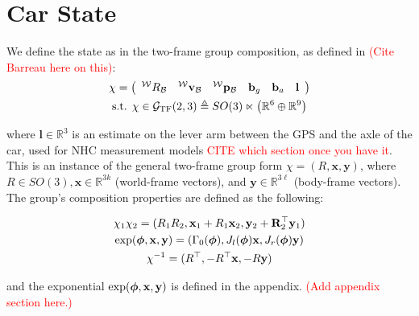 \section{Car State}

We define the state as in the two-frame group composition, as defined in \textcolor{red}{(Cite Barreau here on this)}:
\begin{equation}
  \begin{gathered}
  \chi = \left(
    \begin{array}{cccccc}
      {}^\mathcal{W}R_\mathcal{B} &
      {}^\mathcal{W}\mathbf{v}_{\mathcal{B}} &
      {}^\mathcal{W}\mathbf{p}_{\mathcal{B}} &
      \mathbf{b}_g &
      \mathbf{b}_a &
      \mathbf{l}
    \end{array}
  \right) \\
  \text{s.t. } \chi \in \mathcal{G}_{\mathrm{TF}}(2,3) \triangleq SO(3) \ltimes \left(\mathbb{R}^{6} \oplus \mathbb{R}^{9}\right)
  \end{gathered}
  \label{eq:car_state}
\end{equation}

where $\mathbf{l}\in \mathbb{R}^3$ is an estimate on the lever arm between the GPS and the axle of the car, used for NHC measurement models \textcolor{red}{CITE which section once you have it}. This is an instance of the general two-frame group form $\chi = (R,\mathbf{x},\mathbf{y})$, where $R\in SO(3), \mathbf{x} \in \mathbb{R}^{3k}$ (world-frame vectors), and $\mathbf{y} \in \mathbb{R}^{3\ell}$ (body-frame vectors). The group's composition properties are defined as the following:

\begin{equation}
  \begin{gathered}
    \chi_1\chi_2 = (R_1R_2, \mathbf{x}_1 + R_1\mathbf{x}_2, \mathbf{y}_2 + \mathbf{R}_2^\top \mathbf{y}_1) \\
    \exp(\boldsymbol{\phi},\mathbf{x},\mathbf{y}) = (\Gamma_0(\boldsymbol{\phi}),J_l(\boldsymbol{\phi})\mathbf{x},J_r(\boldsymbol{\phi})\mathbf{y}) \\
    \chi^{-1} = (R^\top, -R^\top \mathbf{x}, -R\mathbf{y})
  \end{gathered}
  \label{eq:tfg_properties}
\end{equation}

and the exponential $\exp(\boldsymbol{\phi}, \mathbf{x}, \mathbf{y})$ is defined in the appendix. \textcolor{red}{(Add appendix section here.)}

